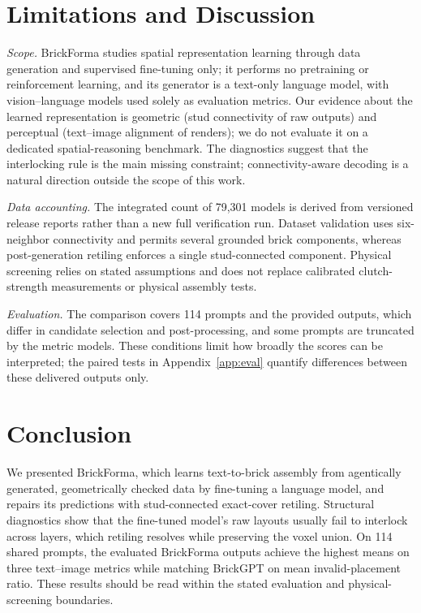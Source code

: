 \documentclass[letterpaper]{article} %
\begin{document}
\section{Limitations and Discussion}
\label{sec:limitations}
\emph{Scope.} BrickForma studies spatial representation learning through data generation and supervised fine-tuning only; it performs no pretraining or reinforcement learning, and its generator is a text-only language model, with vision--language models used solely as evaluation metrics. Our evidence about the learned representation is geometric (stud connectivity of raw outputs) and perceptual (text--image alignment of renders); we do not evaluate it on a dedicated spatial-reasoning benchmark. The diagnostics suggest that the interlocking rule is the main missing constraint; connectivity-aware decoding is a natural direction outside the scope of this work.

\emph{Data accounting.} The integrated count of 79,301 models is derived from versioned release reports rather than a new full verification run. Dataset validation uses six-neighbor connectivity and permits several grounded brick components, whereas post-generation retiling enforces a single stud-connected component. Physical screening relies on stated assumptions and does not replace calibrated clutch-strength measurements or physical assembly tests.

\emph{Evaluation.} The comparison covers 114 prompts and the provided outputs, which differ in candidate selection and post-processing, and some prompts are truncated by the metric models. These conditions limit how broadly the scores can be interpreted; the paired tests in Appendix~\ref{app:eval} quantify differences between these delivered outputs only.

\section{Conclusion}
We presented BrickForma, which learns text-to-brick assembly from agentically generated, geometrically checked data by fine-tuning a language model, and repairs its predictions with stud-connected exact-cover retiling. Structural diagnostics show that the fine-tuned model's raw layouts usually fail to interlock across layers, which retiling resolves while preserving the voxel union. On 114 shared prompts, the evaluated BrickForma outputs achieve the highest means on three text--image metrics while matching BrickGPT on mean invalid-placement ratio. These results should be read within the stated evaluation and physical-screening boundaries.
\end{document}
